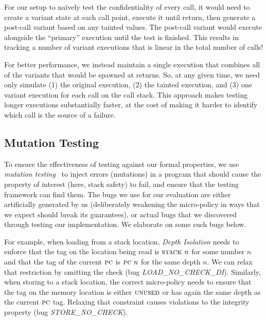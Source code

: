 \documentclass[10pt,conference]{ieeetran}%
\theoremstyle{definition}
\begin{document}
For our setup to na\"{i}vely test the confidentiality of every call,
it would need to create a variant state at each call point, execute
it until return, then generate a post-call variant based on any tainted
values. The post-call variant would execute alongside the ``primary''
execution until the test is finished. This results in tracking a number
of variant executions that is linear in the total number of calls!

For better performance, we instead maintain a single execution that combines
all of the variants that would be spawned at returns.
So, at any given time, we need only simulate
(1) the original execution, (2) the tainted execution, and (3) one
variant execution for each call on the call stack. This approach
makes testing longer executions substantially faster, at the cost of making it
harder to identify which call is the source of a failure.

\subsection{Mutation Testing}

To ensure the effectiveness of testing against our formal properties, we
use {\em mutation testing}~\cite{JiaH11} to inject errors
(mutations) in a program that should cause the property of interest (here,
stack safety) to fail, and ensure that the testing framework can find
them. The bugs we use for our evaluation are either artificially generated
by us (deliberately weakening the micro-policy in ways that we expect
should break its guarantees), or actual bugs that we discovered through
testing our implementation. We elaborate on some such bugs below.

For example, when loading from a stack location, {\em Depth Isolation}
needs to enforce that the tag on the location being read
is $\textsc{stack} ~ n$ for some number $n$ and that the tag of the
current $\textsc{pc}$ is $\textsc{pc} ~ n$ for the same depth $n$. We can relax
that restriction by omitting the check (bug {\em
  LOAD\_NO\_CHECK\_DI}).
%
Similarly, when storing to a stack location, the correct micro-policy
needs to ensure that the tag on the memory location is either
$\textsc{unused}$ or has again the same depth as the current $\textsc{pc}$
tag. Relaxing that constraint causes violations to the integrity
property (bug {\em STORE\_NO\_CHECK}).
\end{document}
